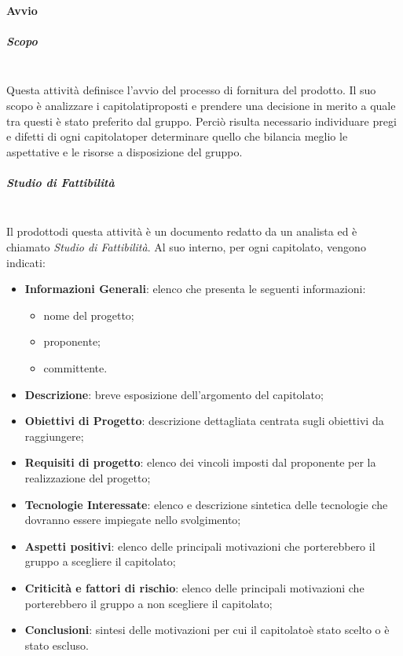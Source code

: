 			\paragraph{Avvio}
			\subparagraph*{Scopo}\mbox{}\\ [1mm]
				Questa attività  definisce l'avvio del processo di fornitura del prodotto\glosp. Il suo scopo è analizzare i capitolati\glosp proposti e  prendere una decisione in merito a quale tra questi è stato preferito dal gruppo.
				Perciò risulta necessario individuare pregi e difetti di ogni capitolato\glosp per determinare quello che bilancia meglio le aspettative e le risorse a disposizione del gruppo. 
				\subparagraph*{Studio di Fattibilità}\mbox{}\\ [1mm]
				Il prodotto\glosp di questa attività è un documento redatto da un analista ed è chiamato \textit{Studio di Fattibilità}. Al suo interno, per ogni capitolato\glo, vengono indicati:
				\begin{itemize}
					\item \textbf{Informazioni Generali}: elenco che presenta le seguenti informazioni: 
					\begin{itemize}
						\item nome del progetto\glo;
						\item proponente;
						\item committente.
					\end{itemize} 
					\item \textbf{Descrizione}: breve esposizione dell'argomento del capitolato\glo;
					\item \textbf{Obiettivi di Progetto}: descrizione dettagliata centrata sugli obiettivi da raggiungere;
					\item \textbf{Requisiti di progetto}: elenco dei vincoli imposti dal proponente per la realizzazione del progetto\glo;
					\item \textbf{Tecnologie Interessate}: elenco e descrizione sintetica delle tecnologie che dovranno essere impiegate nello svolgimento;
					\item \textbf{Aspetti positivi}: elenco delle principali motivazioni che porterebbero il gruppo a scegliere il capitolato\glo;
					\item \textbf{Criticità e fattori di rischio}: elenco delle principali motivazioni che porterebbero il gruppo a non scegliere il capitolato\glo;
					\item \textbf{Conclusioni}: sintesi delle motivazioni per cui il capitolato\glosp è stato scelto o è stato escluso.
				\end{itemize}
